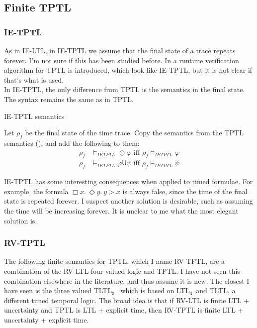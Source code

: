 \documentclass[a4paper]{article}
\newcommand{\U}{\mathsf{U}}
\newcommand{\tiff}{\text{ iff }}
\newcommand{\ltlt}{LTL$_3$}
\begin{document}
\subsection{Finite TPTL}

\subsubsection{IE-TPTL} As in IE-LTL, in IE-TPTL we assume that the final state of a trace repeats forever.  I'm not sure if this has been studied before. In \textcite{chai2013rewriting} a runtime verification algorithm for TPTL is introduced, which look like IE-TPTL, but it is not clear if that's what is used.\\
In IE-TPTL, the only difference from TPTL is the semantics in the final state. The syntax remains the same as in TPTL.

\begin{defn}{IE-TPTL semantics}

  Let $\rho_f$ be the final state of the time trace. Copy the semantics from the TPTL semantics (), and add the following to them:
  \begin{align*}
    \rho_f &\vDash_{IETPTL} \bigcirc \varphi \tiff \rho_f \vDash_{IETPTL} \varphi\\
    \rho_f &\vDash_{IETPTL} \varphi \U \psi \tiff \rho_f \vDash_{IETPTL} \psi
  \end{align*}
\end{defn}

\begin{remk}
IE-TPTL has some interesting consequences when applied to timed formulae. For example, the formula $\Box x.~ \Diamond y.~ y > x$ is always false, since the time of the final state is repeated forever. I suspect another solution is desirable, such as assuming the time will be increasing forever. It is unclear to me what the most elegant solution is.
\end{remk}

\subsubsection{RV-TPTL} The following finite semantics for TPTL, which I name RV-TPTL, are a combination of the RV-LTL four valued logic and TPTL. I have not seen this combination elsewhere in the literature, and thus assume it is new. The closest I have seen is the three valued TLTL$_3$~\autocite[6]{arafat2005runtime} which is based on \ltlt\ and TLTL, a different timed temporal logic. The broad idea is that if RV-LTL is finite LTL + uncertainty and TPTL is LTL + explicit time, then RV-TPTL is finite LTL + uncertainty + explicit time.
\end{document}
